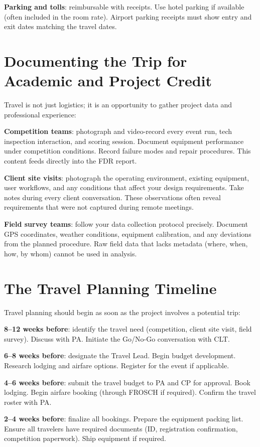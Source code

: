 \textbf{Parking and tolls}: reimbursable with receipts. Use hotel parking if available (often included in the room rate). Airport parking receipts must show entry and exit dates matching the travel dates.

\section{Documenting the Trip for Academic and Project Credit}
Travel is not just logistics; it is an opportunity to gather project data and professional experience:

\textbf{Competition teams}: photograph and video-record every event run, tech inspection interaction, and scoring session. Document equipment performance under competition conditions. Record failure modes and repair procedures. This content feeds directly into the FDR report.

\textbf{Client site visits}: photograph the operating environment, existing equipment, user workflows, and any conditions that affect your design requirements. Take notes during every client conversation. These observations often reveal requirements that were not captured during remote meetings.

\textbf{Field survey teams}: follow your data collection protocol precisely. Document GPS coordinates, weather conditions, equipment calibration, and any deviations from the planned procedure. Raw field data that lacks metadata (where, when, how, by whom) cannot be used in analysis.



\section{The Travel Planning Timeline}
Travel planning should begin as soon as the project involves a potential trip:

\textbf{8--12 weeks before}: identify the travel need (competition, client site visit, field survey). Discuss with PA. Initiate the Go/No-Go conversation with CLT.

\textbf{6--8 weeks before}: designate the Travel Lead. Begin budget development. Research lodging and airfare options. Register for the event if applicable.

\textbf{4--6 weeks before}: submit the travel budget to PA and CP for approval. Book lodging. Begin airfare booking (through FROSCH if required). Confirm the travel roster with PA.

\textbf{2--4 weeks before}: finalize all bookings. Prepare the equipment packing list. Ensure all travelers have required documents (ID, registration confirmation, competition paperwork). Ship equipment if required.

